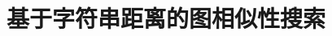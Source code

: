 \documentclass{XDBAthesis}
\begin{document}
\else
\fi
\chapter{基于字符串距离的图相似性搜索}
\label{chap:gHash}


\ifx\allfiles\undefined
%

\end{document}
